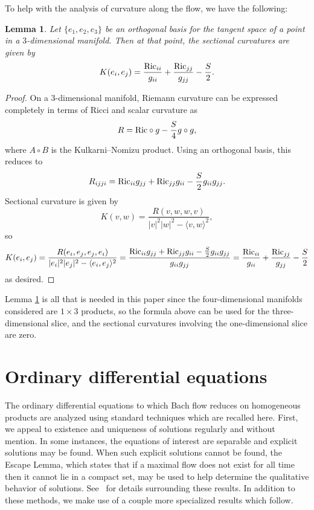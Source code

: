 \documentclass[10pt,a4paper]{amsart}
\numberwithin{equation}{section}
\newtheorem{Lemma}[Theorem]{Lemma}
\begin{document}
To help with the analysis of curvature along the flow, we have the following:

\begin{Lemma} \label{sectionalcurvaturelemma}Let $\{e_1, e_2, e_3\}$ be an orthogonal basis for the tangent space of a point in a $3$-dimensional manifold. Then at that point, the sectional curvatures are given by
\[
K(e_i, e_j) = \frac{{\rm Ric}_{ii}}{g_{ii}} + \frac{{\rm Ric}_{jj}}{g_{jj}} - \frac{S}{2}.
\]
\end{Lemma}

\begin{proof}
On a 3-dimensional manifold, Riemann curvature can be expressed completely in terms of Ricci and scalar curvature as
\[
R = {\rm Ric} \circ g - \frac{S}{4} g \circ g,
\]
where $A \circ B$ is the Kulkarni--Nomizu product. Using an orthogonal basis, this reduces to
\[
R_{ijji} = {\rm Ric}_{ii} g_{jj} + {\rm Ric}_{jj} g_{ii} - \frac{S}{2} g_{ii} g_{jj}.
\]
Sectional curvature is given by
\[
K(v, w) = \frac{R(v, w, w, v)}{|v|^2 |w|^2 - \langle v, w \rangle^2},
\]
so
\begin{gather*}
K(e_i, e_j) = \frac{R(e_i, e_j, e_j, e_i)}{|e_i|^2 |e_j|^2 - \langle e_i, e_j \rangle^2}
		 = \frac{{\rm Ric}_{ii} g_{jj} + {\rm Ric}_{jj} g_{ii} - \frac{S}{2} g_{ii} g_{jj}}{g_{ii} g_{jj}} = \frac{{\rm Ric}_{ii}}{g_{ii}} + \frac{{\rm Ric}_{jj}}{g_{jj}} - \frac{S}{2}
\end{gather*}
as desired.
\end{proof}

Lemma \ref{sectionalcurvaturelemma} is all that is needed in this paper since the four-dimensional manifolds considered are $1 \times 3$ products, so the formula above can be used for the three-dimensional slice, and the sectional curvatures involving the one-dimensional slice are zero.

\section{Ordinary differential equations} \label{odesec}

The ordinary differential equations to which Bach flow reduces on homogeneous products are analyzed using standard techniques which are recalled here. First, we appeal to existence and uniqueness of solutions regularly and without mention. In some instances, the equations of interest are separable and explicit solutions may be found. When such explicit solutions cannot be found, the Escape Lemma, which states that if a maximal flow does not exist for all time then it cannot lie in a compact set, may be used to help determine the qualitative behavior of solutions. See~\cite{Jack2} for details surrounding these results. In addition to these methods, we make use of a couple more specialized results which follow.
\end{document}
